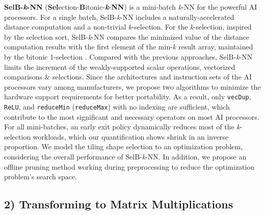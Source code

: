\documentclass[12pt]{extbook}
\begin{document}
\textbf{SelB-\textit{k}-NN} (\textbf{Sel}ection-\textbf{B}itonic-\textbf{\textit{k}}-\textbf{NN}) is a mini-batch \textit{k}-NN for the powerful AI processors. For a single batch, SelB-\textit{k}-NN includes a naturally-accelerated distance computation and a non-trivial \textit{k}-selection. For the \textit{k}-selection, inspired by the selection sort, SelB-\textit{k}-NN compares the minimized value of the distance computation results with the first element of the min-\textit{k} result array, maintained by the bitonic 1-selection \cite{DBLP:conf/sigmod/ShanbhagPM18}. Compared with the previous approaches, SelB-\textit{k}-NN limits the increment of the weakly-supported scalar operations, vectorized comparisons \& selections. Since the architectures and instruction sets of the AI processors vary among manufacturers, we propose two algorithms to minimize the hardware support requirements for better portability. As a result, only \verb|vecDup|, \verb|ReLU|, and \verb|reduceMin| (\verb|reduceMax|) with no indexing are sufficient, which contribute to the most significant and necessary operators on most AI processors. For all mini-batches, an early exit policy dynamically reduces most of the \textit{k}-selection workloads, which our quantification shows shrink in an inverse proportion. We model the tiling shape selection to an optimization problem, considering the overall performance of SelB-\textit{k}-NN. In addition, we propose an offline pruning method working during preprocessing to reduce the optimization problem's search space.

\subsection{2) Transforming to Matrix Multiplications}
\end{document}
